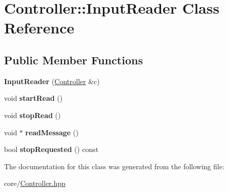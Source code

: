 \hypertarget{classController_1_1InputReader}{}\section{Controller\+:\+:Input\+Reader Class Reference}
\label{classController_1_1InputReader}
\subsection*{Public Member Functions}
\begin{DoxyCompactItemize}
\item 
{\bfseries Input\+Reader} (\hyperlink{classController}{Controller} \&c)\hypertarget{classController_1_1InputReader_a536509b60d654c0892331c76ee3f09cb}{}\label{classController_1_1InputReader_a536509b60d654c0892331c76ee3f09cb}

\item 
void {\bfseries start\+Read} ()\hypertarget{classController_1_1InputReader_a134007ad7f69aef3b2ca5a9dc91d41f0}{}\label{classController_1_1InputReader_a134007ad7f69aef3b2ca5a9dc91d41f0}

\item 
void {\bfseries stop\+Read} ()\hypertarget{classController_1_1InputReader_a5775754db3fd7f0e1d8b338e3654c2b4}{}\label{classController_1_1InputReader_a5775754db3fd7f0e1d8b338e3654c2b4}

\item 
void $\ast$ {\bfseries read\+Message} ()\hypertarget{classController_1_1InputReader_a860914624a02a252b1a6d6294ab94ac1}{}\label{classController_1_1InputReader_a860914624a02a252b1a6d6294ab94ac1}

\item 
bool {\bfseries stop\+Requested} () const \hypertarget{classController_1_1InputReader_abff9d19cd6c3ccae815bbe85ffe5076f}{}\label{classController_1_1InputReader_abff9d19cd6c3ccae815bbe85ffe5076f}

\end{DoxyCompactItemize}


The documentation for this class was generated from the following file\+:\begin{DoxyCompactItemize}
\item 
core/\hyperlink{Controller_8hpp}{Controller.\+hpp}\end{DoxyCompactItemize}
